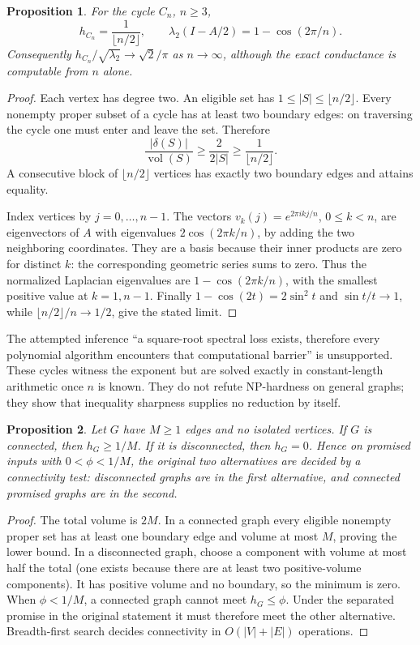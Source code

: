 \documentclass[11pt,a4paper]{article}
\newtheorem{proposition}{Proposition}
\begin{document}
\begin{proposition}
For the cycle $C_n$, $n\ge3$,
\[
 h_{C_n}=\frac1{\lfloor n/2\rfloor},\qquad
 \lambda_2(I-A/2)=1-\cos(2\pi/n).
\]
Consequently $h_{C_n}/\sqrt{\lambda_2}\to\sqrt2/\pi$ as $n\to\infty$, although the exact conductance is computable from $n$ alone.
\end{proposition}
\begin{proof}
Each vertex has degree two. An eligible set has $1\le|S|\le\lfloor n/2\rfloor$. Every nonempty proper subset of a cycle has at least two boundary edges: on traversing the cycle one must enter and leave the set. Therefore
\[
 \frac{|\delta(S)|}{\operatorname{vol}(S)}\ge\frac2{2|S|}
 \ge\frac1{\lfloor n/2\rfloor}.
\]
A consecutive block of $\lfloor n/2\rfloor$ vertices has exactly two boundary edges and attains equality.

Index vertices by $j=0,\ldots,n-1$. The vectors $v_k(j)=e^{2\pi i k j/n}$, $0\le k<n$, are eigenvectors of $A$ with eigenvalues $2\cos(2\pi k/n)$, by adding the two neighboring coordinates. They are a basis because their inner products are zero for distinct $k$: the corresponding geometric series sums to zero. Thus the normalized Laplacian eigenvalues are $1-\cos(2\pi k/n)$, with the smallest positive value at $k=1,n-1$. Finally $1-\cos(2t)=2\sin^2t$ and $\sin t/t\to1$, while $\lfloor n/2\rfloor/n\to1/2$, give the stated limit.
\end{proof}

The attempted inference ``a square-root spectral loss exists, therefore every polynomial algorithm encounters that computational barrier'' is unsupported. These cycles witness the exponent but are solved exactly in constant-length arithmetic once $n$ is known. They do not refute NP-hardness on general graphs; they show that inequality sharpness supplies no reduction by itself.

\begin{proposition}
Let $G$ have $M\ge1$ edges and no isolated vertices. If $G$ is connected, then $h_G\ge1/M$. If it is disconnected, then $h_G=0$. Hence on promised inputs with $0<\phi<1/M$, the original two alternatives are decided by a connectivity test: disconnected graphs are in the first alternative, and connected promised graphs are in the second.
\end{proposition}
\begin{proof}
The total volume is $2M$. In a connected graph every eligible nonempty proper set has at least one boundary edge and volume at most $M$, proving the lower bound. In a disconnected graph, choose a component with volume at most half the total (one exists because there are at least two positive-volume components). It has positive volume and no boundary, so the minimum is zero. When $\phi<1/M$, a connected graph cannot meet $h_G\le\phi$. Under the separated promise in the original statement it must therefore meet the other alternative. Breadth-first search decides connectivity in $O(|V|+|E|)$ operations.
\end{proof}
\end{document}
